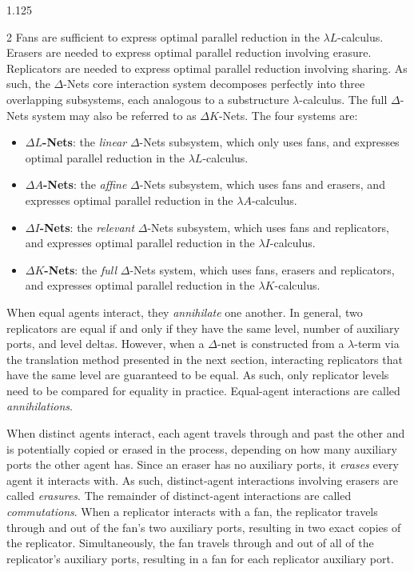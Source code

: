 \documentclass[10pt]{article}
\begin{document}
\begin{spacing}{1.125}
\begin{multicols}{2}
Fans are sufficient to express optimal parallel reduction in the \mbox{$\lambda L$-calculus}.
Erasers are needed to express optimal parallel reduction involving erasure.
Replicators are needed to express optimal parallel reduction involving sharing.
As such, the \mbox{$\Delta$-Nets} core interaction system decomposes perfectly into three overlapping subsystems, each analogous to a substructure \mbox{$\lambda$-calculus}. The full \mbox{$\Delta$-Nets} system may also be referred to as \mbox{$\Delta K$-Nets}. The four systems are:

\begin{itemize}
\item \textbf{\mbox{$\Delta L$-Nets}}: the \textit{linear} \mbox{$\Delta$-Nets} subsystem, which only uses fans, and expresses optimal parallel reduction in the \mbox{$\lambda L$-calculus}.
\item \textbf{\mbox{$\Delta A$-Nets}}: the \textit{affine} \mbox{$\Delta$-Nets} subsystem, which uses fans and erasers, and expresses optimal parallel reduction in the \mbox{$\lambda A$-calculus}.
\item \textbf{\mbox{$\Delta I$-Nets}}: the \textit{relevant} \mbox{$\Delta$-Nets} subsystem, which uses fans and replicators, and expresses optimal parallel reduction in the \mbox{$\lambda I$-calculus}.
\item \textbf{\mbox{$\Delta K$-Nets}}: the \textit{full} \mbox{$\Delta$-Nets} system, which uses fans, erasers and replicators, and expresses optimal parallel reduction in the \mbox{$\lambda K$-calculus}.
\end{itemize}

When equal agents interact, they \textit{annihilate} one another. In general, two replicators are equal if and only if they have the same level, number of auxiliary ports, and level deltas. However, when a \mbox{$\Delta$-net} is constructed from a \mbox{$\lambda$-term} via the translation method presented in the next section, interacting replicators that have the same level are guaranteed to be equal. As such, only replicator levels need to be compared for equality in practice. Equal-agent interactions are called \textit{annihilations}.

When distinct agents interact, each agent travels through and past the other and is potentially copied or erased in the process, depending on how many auxiliary ports the other agent has. Since an eraser has no auxiliary ports, it \textit{erases} every agent it interacts with. As such, distinct-agent interactions involving erasers are called \textit{erasures}. The remainder of distinct-agent interactions are called \textit{commutations}.
When a replicator interacts with a fan, the replicator travels through and out of the fan's two auxiliary ports, resulting in two exact copies of the replicator. Simultaneously, the fan travels through and out of all of the replicator's auxiliary ports, resulting in a fan for each replicator auxiliary port.


\end{multicols}
\end{spacing}
\end{document}
